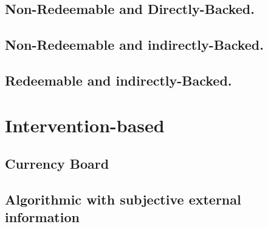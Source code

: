 \subsection{Non-Redeemable and Directly-Backed.}
% 

\subsection{Non-Redeemable and indirectly-Backed.}


\subsection{Redeemable and indirectly-Backed.}



\section{Intervention-based} %

 
\subsection{Currency Board}

\subsection{Algorithmic with subjective external information}

